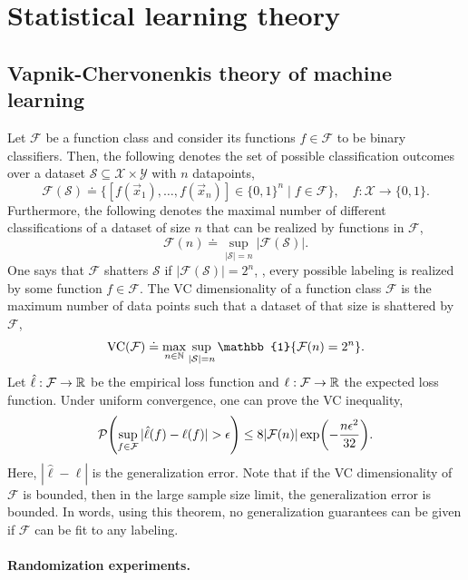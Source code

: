 \section{Statistical learning theory}

\subsection{Vapnik-Chervonenkis theory of machine learning}

Let $\mathcal{F}$ be a function class and consider its functions $f \in \mathcal{F}$ to be binary
classifiers. Then, the following denotes the set of possible classification outcomes over a dataset
$\mathcal{S} \subseteq \mathcal{X} \times \mathcal{Y}$ with $n$ datapoints, \[
    \mathcal{F}(\mathcal{S}) \doteq \{ [f(\vec{x}_1), \ldots, f(\vec{x}_n)] \in \{ 0,1 \}^n \mid f \in \mathcal{F} \}, \quad f: \mathcal{X} \to \{ 0,1 \}.
\]
Furthermore, the following denotes the maximal number of different classifications of a dataset of
size $n$ that can be realized by functions in $\mathcal{F}$, \[
    \mathcal{F}(n) \doteq \sup_{|\mathcal{S}| = n} | \mathcal{F}(\mathcal{S}) |.
\]
One says that $\mathcal{F}$ shatters $\mathcal{S}$ if $|\mathcal{F}(\mathcal{S})| = 2^n$, \ie,
every possible labeling is realized by some function $f \in \mathcal{F}$. The VC dimensionality of
a function class $\mathcal{F}$ is the maximum number of data points such that a dataset of that
size is shattered by $\mathcal{F}$, \[
    \mathrm{VC}(\mathcal{F}) \doteq \max_{n\in \N} \sup_{|\mathcal{S}|=n} \mathbb{1}\{ \mathcal{F}(n) = 2^n \}.
\]
Let $\hat{\ell}: \mathcal{F} \to \mathbb{R}$ be the empirical loss function and $\ell: \mathcal{F} \to \mathbb{R}$
the expected loss function. Under uniform convergence, one can prove the VC inequality, \[
    \mathcal{P} \lft( \sup_{f \in \mathcal{F}} |\hat{\ell}(f) - \ell(f)| > \epsilon \rgt) \leq 8 |\mathcal{F}(n)| \exp \lft( -\frac{n \epsilon^2}{32} \rgt).
\]
Here, $|\hat{\ell} - \ell|$ is the generalization error. Note that if the VC dimensionality of
$\mathcal{F}$ is bounded, then in the large sample size limit, the generalization error is bounded.
In words, using this theorem, no generalization guarantees can be given if $\mathcal{F}$ can be fit
to any labeling.

\paragraph{Randomization experiments.}

